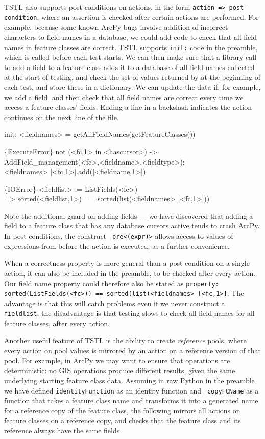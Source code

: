 TSTL also supports post-conditions on actions, in the form {\tt action
  => post-condition}, where an assertion is
checked after certain actions are performed.  For example, because
some known ArcPy bugs involve addition of incorrect characters to
field names in a database, we could add code to check that all field
names in feature classes are correct.  TSTL supports {\tt init:} code
in the preamble, which is called before each test starts.  We can then
make sure that a library call to add a field to a feature class adds
it to a database of all field names collected at the start of testing,
and check the set of values returned by 
at the beginning of each test, and store these in a dictionary.  We
can update the data if, for example, we add a field, and then check
that all field names are correct every time we access a feature
classes' fields.  Ending a line in a backslash indicates the action
continues on the next line of the file.

{\scriptsize
\begin{code}
init: <fieldnames> = getAllFieldNames(getFeatureClasses())

\{ExecuteError\} not (<fc,1> in <hascursor>) -> \\
   AddField\_management(<fc>,<fieldname>,<fieldtype>); \\
   <fieldnames> [<fc,1>].add([<fieldname,1>])

\{IOError\} <fieldlist> := ListFields(<fc>) \\
  => sorted(<fieldlist,1>) == sorted(list(<fieldnames> [<fc,1>]))
\end{code}
}

Note the additional guard on adding fields --- we have discovered that
adding a field to a feature class that has any database cursors active
tends to crash ArcPy.  In post-conditions, the construct {\tt
  pre<(expr)>} allows access to values of expressions from before the
action is executed, as a further convenience.

When a correctness property is more general than a post-condition on a
single action, it can also be included in the preamble, to be checked
after every action.  Our field name property could therefore also be
stated as {\tt property: sorted(ListFields(<fc>)) ==
  sorted(list(<fieldnames> [<fc,1>]}.  The advantage is that this will
catch problems even if we never construct a {\tt fieldlist}; the
disadvantage is that testing slows to check all field names for all
feature classes, after every action.

Another useful feature of TSTL is the ability to create
\emph{reference} pools, where every action on pool values is mirrored
by an action on a reference version of that pool.  For example, in
ArcPy we may want to ensure that operations are deterministic:  no GIS
operations produce different results, given the same underlying starting
feature class data.  Assuming in raw Python in the preamble we have
defined {\tt identityFunction} as an identity function and {\tt
  copyFCName} as a function that takes a feature class name and
transforms it into a generated name for a reference copy of the
feature class, the following mirrors all actions on feature
classes on a reference copy, and checks that the feature class and its
reference always have the same fields. 

